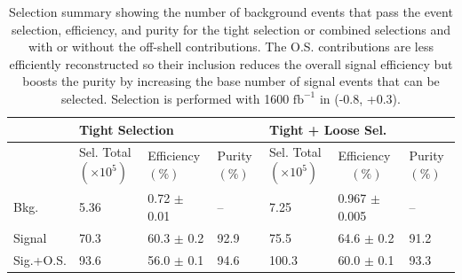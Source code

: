 \begin{table}
\caption{Selection summary showing the number of background events that pass the event selection, efficiency, and purity for the tight selection or combined selections and with or without the off-shell contributions.  The O.S. contributions are less efficiently reconstructed so their inclusion reduces the overall signal efficiency but boosts the purity by increasing the base number of signal events that can be selected. Selection is performed with 1600 $\text{fb}^{-1}$ in (-0.8, +0.3). }
\label{tab:summary}
 \begin{tabular}{ |p{}|p{}p{}|p{}|p{}p{}|p{}|} 
 \hline 
   &  \multicolumn{3}{|l|}{Tight Selection} &  \multicolumn{3}{|l|}{ Tight + Loose Sel.}  \\  \hline  
 & Sel. Total $(\times 10^5)$ & Efficiency $(\%)$ & Purity $(\%)$ & Sel. Total $(\times 10^5)$ & Efficiency $\,\,\,\,$ $(\%)$& Purity $(\%)$ \\ 
 \hline  
 Bkg. &  {5.36} & 0.72 $\pm$ 0.01 & --&  {7.25} & 0.967 $\pm$ 0.005 &--  \\ 
 Signal &  {70.3} & 60.3 $\pm$ 0.2 & 92.9  &  {75.5} & 64.6 $\pm$ 0.2 & 91.2 \\ 
 Sig.+O.S. &  {93.6} & 56.0 $\pm$ 0.1 & 94.6 &  {100.3} & 60.0 $\pm$ 0.1 & 93.3 \\ 
\hline 
\end{tabular} 
\end{table}




